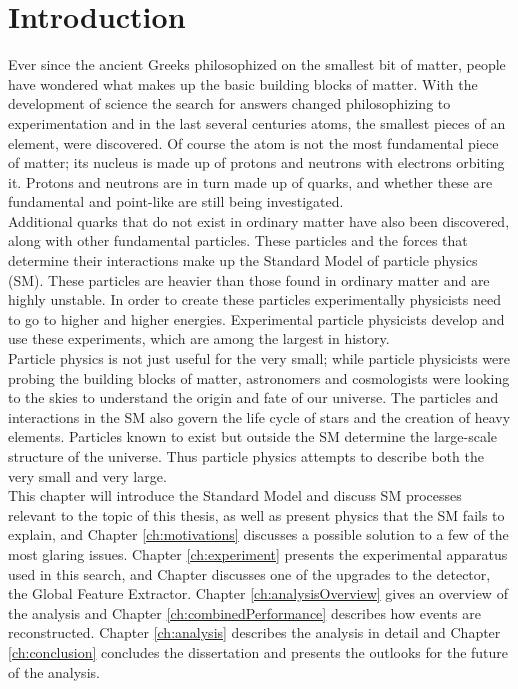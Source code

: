 \chapter{Introduction}
\label{ch:intro}



Ever since the ancient Greeks philosophized on the smallest bit of matter, people have wondered what makes up the basic building blocks of matter.  With the development of science the search for answers changed philosophizing to experimentation and in the last several centuries atoms, the smallest pieces of an element, were discovered.  Of course the atom is not the most fundamental piece of matter; its nucleus is made up of protons and neutrons with electrons orbiting it.  Protons and neutrons are in turn made up of quarks, and whether these are fundamental and point-like are still being investigated.  \\

Additional quarks that do not exist in ordinary matter have also been discovered, along with other fundamental particles.  These particles and the forces that determine their interactions make up the Standard Model of particle physics (SM).  These particles are heavier than those found in ordinary matter and are highly unstable.  In order to create these particles experimentally physicists need to go to higher and higher energies.  Experimental particle physicists develop and use these experiments, which are among the largest in history.  \\

Particle physics is not just useful for the very small; while particle physicists were probing the building blocks of matter, astronomers and cosmologists were looking to the skies to understand the origin and fate of our universe.  The particles and interactions in the SM also govern the life cycle of stars and the creation of heavy elements.  Particles known to exist but outside the SM determine the large-scale structure of the universe.  Thus particle physics attempts to describe both the very small and very large. \\

This chapter will introduce the Standard Model and discuss SM processes relevant to the topic of this thesis, as well as present physics that the SM fails to explain, and Chapter \ref{ch:motivations} discusses a possible solution to a few of the most glaring issues.  Chapter \ref{ch:experiment} presents the experimental apparatus used in this search, and Chapter  discusses one of the upgrades to the detector, the Global Feature Extractor.  Chapter \ref{ch:analysisOverview} gives an overview of the analysis and Chapter \ref{ch:combinedPerformance} describes how events are reconstructed.  Chapter \ref{ch:analysis} describes the analysis in detail and Chapter \ref{ch:conclusion} concludes the dissertation and presents the outlooks for the future of the analysis.  \\


